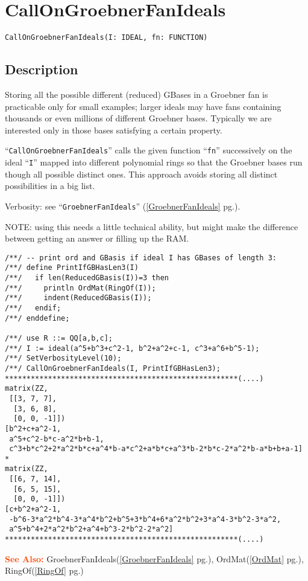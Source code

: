 \documentclass[a4paper]{mybook}
\newenvironment{command}{}{} %
\newcommand\SeeAlso{\par\textcolor{OrangeRed}{\textbf{\large See Also: }}}
\begin{document}
\section{CallOnGroebnerFanIdeals}
\label{CallOnGroebnerFanIdeals}
\begin{command} %


\begin{Verbatim}[label=syntax, rulecolor=\color{MidnightBlue},
frame=single]
CallOnGroebnerFanIdeals(I: IDEAL, fn: FUNCTION)
\end{Verbatim}


\subsection*{Description}

Storing all the possible different (reduced) GBases in a Groebner
fan is practicable only for small examples; larger ideals may have
fans containing thousands or even millions of different Groebner bases.
Typically we are interested only in those bases satisfying a
certain property.
\par 
``\verb&CallOnGroebnerFanIdeals&'' calls the given function ``\verb&fn&'' successively
on the ideal ``\verb&I&'' mapped into different polynomial rings so that
the Groebner bases run though all possible distinct ones.  This approach
avoids storing all distinct possibilities in a big list.
\par 
Verbosity: see ``\verb&GroebnerFanIdeals&'' (\ref{GroebnerFanIdeals} pg.\pageref{GroebnerFanIdeals}).
\par 
NOTE: using this needs a little technical ability, but might make the
difference between getting an answer or filling up the RAM.
\begin{Verbatim}[label=example, rulecolor=\color{PineGreen}, frame=single]
/**/ -- print ord and GBasis if ideal I has GBases of length 3:
/**/ define PrintIfGBHasLen3(I)
/**/   if len(ReducedGBasis(I))=3 then
/**/     println OrdMat(RingOf(I));
/**/     indent(ReducedGBasis(I));
/**/   endif;
/**/ enddefine;

/**/ use R ::= QQ[a,b,c];
/**/ I := ideal(a^5+b^3+c^2-1, b^2+a^2+c-1, c^3+a^6+b^5-1);
/**/ SetVerbosityLevel(10);
/**/ CallOnGroebnerFanIdeals(I, PrintIfGBHasLen3);
******************************************************(....)
matrix(ZZ,
 [[3, 7, 7],
  [3, 6, 8],
  [0, 0, -1]])
[b^2+c+a^2-1,
 a^5+c^2-b*c-a^2*b+b-1,
 c^3+b*c^2+2*a^2*b*c+a^4*b-a*c^2+a*b*c+a^3*b-2*b*c-2*a^2*b-a*b+b+a-1]
*
matrix(ZZ,
 [[6, 7, 14],
  [6, 5, 15],
  [0, 0, -1]])
[c+b^2+a^2-1,
 -b^6-3*a^2*b^4-3*a^4*b^2+b^5+3*b^4+6*a^2*b^2+3*a^4-3*b^2-3*a^2,
 a^5+b^4+2*a^2*b^2+a^4+b^3-2*b^2-2*a^2]
******************************************************(....)
\end{Verbatim}


\SeeAlso %
  GroebnerFanIdeals(\ref{GroebnerFanIdeals} pg.\pageref{GroebnerFanIdeals}), 
    OrdMat(\ref{OrdMat} pg.\pageref{OrdMat}), 
    RingOf(\ref{RingOf} pg.\pageref{RingOf})
\end{command} %
\end{document}
